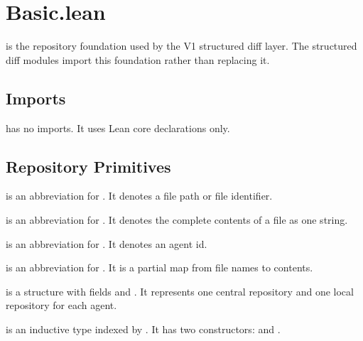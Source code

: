 \section{Basic.lean}

 is the repository foundation used by the V1 structured diff
layer. The structured diff modules import this foundation rather than
replacing it.

\subsection{Imports}

\begin{definition}[No imports]
 has no imports. It uses Lean core declarations only.
\end{definition}

\subsection{Repository Primitives}

\begin{definition}[File]
\code{[File]} is an abbreviation for . It denotes a file path or
file identifier.
\end{definition}

\begin{definition}[Content]
\code{[Content]} is an abbreviation for . It denotes the complete
contents of a file as one string.
\end{definition}

\begin{definition}[Agent]
\code{[Agent]} is an abbreviation for . It denotes an agent id.
\end{definition}

\begin{definition}[Repository]
\code{[Repository]} is an abbreviation for . It is
a partial map from file names to contents.
\end{definition}

\begin{definition}[System]
\code{[System]} is a structure with fields  and
. It represents one central repository and
one local repository for each agent.
\end{definition}

\begin{definition}[Timeline]
\code{[Timeline]} is an inductive type indexed by . It has two
constructors:  and .
\end{definition}

